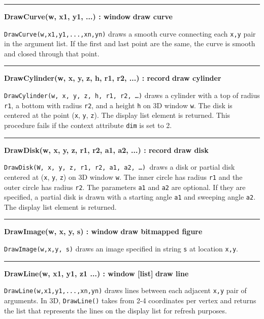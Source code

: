 \bigskip\hrule\vspace{0.1cm}
\noindent
{\bf DrawCurve(w, x1, y1, ...) : window } \hfill {\bf draw curve}

\noindent
\texttt{DrawCurve(w,x1,y1,...,xn,yn)} draws a smooth curve connecting
each \texttt{x,y} pair in the argument list. If the first and last
point are the same, the curve is smooth and closed through that point.

\bigskip\hrule\vspace{0.1cm}
\noindent
{\bf DrawCylinder(w, x, y, z, h, r1, r2, ...) : record } \hfill {\bf draw cylinder}

\noindent
\texttt{DrawCylinder(w, x, y, z, h, r1, r2, {\dots})} draws a cylinder
with a top of radius \texttt{r1}, a bottom with radius \texttt{r2}, and
a height \texttt{h} on 3D window \texttt{w}. The disk is centered at
the point (\texttt{x}, \texttt{y}, \texttt{z}). The display list
element is returned. This procedure fails if the context attribute
\texttt{dim} is set to 2.

\bigskip\hrule\vspace{0.1cm}
\noindent
{\bf DrawDisk(w, x, y, z, r1, r2, a1, a2, ...) : record } \hfill {\bf draw disk}

\noindent
\texttt{DrawDisk(W, x, y, z, r1, r2, a1, a2, {\dots})}\texttt{ }draws a
disk or partial disk centered at (\texttt{x}, \texttt{y}, \texttt{z})
on 3D window \texttt{w}. The inner circle has radius \texttt{r1} and
the outer circle has radius \texttt{r2}. The parameters \texttt{a1} and
\texttt{a2} are optional. If they are specified, a partial disk is
drawn with a starting angle \texttt{a1} and sweeping angle \texttt{a2}.
The display list element is returned.

\bigskip\hrule\vspace{0.1cm}
\noindent
{\bf DrawImage(w, x, y, s) : window } \hfill {\bf draw bitmapped figure}

\noindent
\texttt{DrawImage(w,x,y, s)} draws an image specified in string
\texttt{s} at location \texttt{x,y}.

\bigskip\hrule\vspace{0.1cm}
\noindent
{\bf DrawLine(w, x1, y1, z1 ...) : window [list] } \hfill {\bf draw line}

\noindent
\texttt{DrawLine(w,x1,y1,...,xn,yn)} draws lines between each adjacent
\texttt{x,y} pair of arguments. In 3D, \texttt{DrawLine()} takes from
2-4 coordinates per vertex and returns the list that represents the
lines on the display list for refresh purposes.

